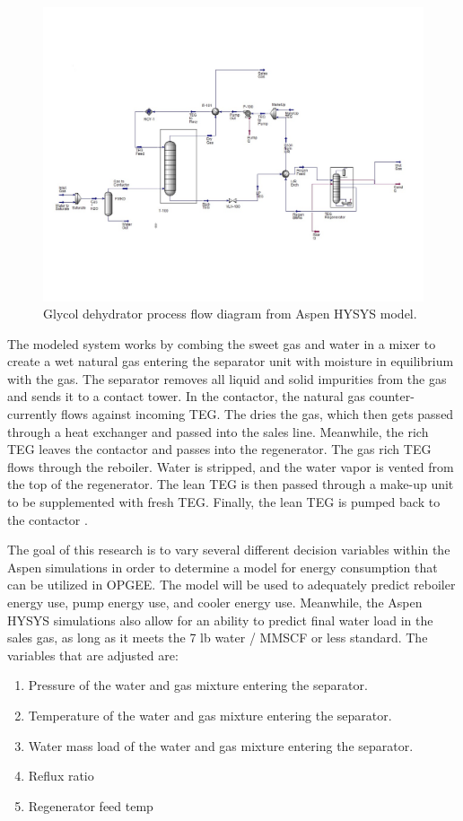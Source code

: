 \documentclass[11pt]{report}
\begin{document}
\begin{figure}[t]
\includegraphics[width=1.1\columnwidth]{images/DehydrationPFD.pdf}
\caption{Glycol dehydrator process flow diagram from Aspen HYSYS model.}
\label{fig:dehyPFDaspen}
\end{figure}

The modeled system works by combing the sweet gas and water in a mixer to create a wet natural gas entering the separator unit with moisture in equilibrium with the gas. The separator removes all liquid and solid impurities from the gas and sends it to a contact tower. In the contactor, the natural gas counter-currently flows against incoming TEG. The dries the gas, which then gets passed through a heat exchanger and passed into the sales line. Meanwhile, the rich TEG leaves the contactor and passes into the regenerator. The gas rich TEG flows through the reboiler. Water is stripped, and the water vapor is vented from the top of the regenerator. The lean TEG is then passed through a make-up unit to be supplemented with fresh TEG. Finally, the lean TEG is pumped back to the contactor \cite{Manning1991}. 

The goal of this research is to vary several different decision variables within the Aspen simulations in order to determine a model for energy consumption that can be utilized in OPGEE. The model will be used to adequately predict reboiler energy use, pump energy use, and cooler energy use. Meanwhile, the Aspen HYSYS simulations also allow for an ability to predict final water load in the sales gas, as long as it meets the 7 lb water / MMSCF or less standard. The variables that are adjusted are:
\begin{enumerate}
\item Pressure of the water and gas mixture entering the separator. 
\item Temperature of the water and gas mixture entering the separator.
\item Water mass load of the water and gas mixture entering the separator.
\item Reflux ratio
\item Regenerator feed temp
\end{enumerate}
\end{document}
